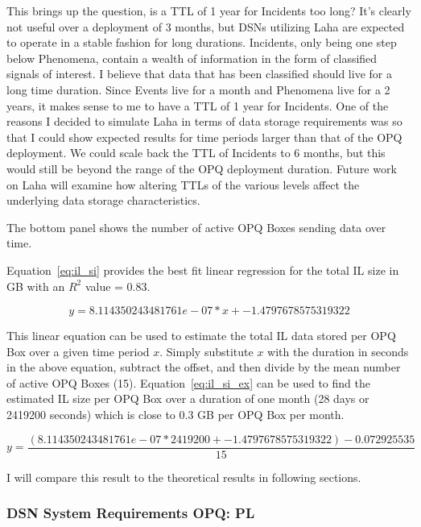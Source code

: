 This brings up the question, is a TTL of 1 year for Incidents too long? It's clearly not useful over a deployment of 3 months, but DSNs utilizing Laha are expected to operate in a stable fashion for long durations. Incidents, only being one step below Phenomena, contain a wealth of information in the form of classified signals of interest. I believe that data that has been classified should live for a long time duration. Since Events live for a month and Phenomena live for a 2 years, it makes sense to me to have a TTL of 1 year for Incidents. One of the reasons I decided to simulate Laha in terms of data storage requirements was so that I could show expected results for time periods larger than that of the OPQ deployment. We could scale back the TTL of Incidents to 6 months, but this would still be beyond the range of the OPQ deployment duration. Future work on Laha will examine how altering TTLs of the various levels affect the underlying data storage characteristics.

The bottom panel shows the number of active OPQ Boxes sending data over time.

Equation~\ref{eq:il_si} provides the best fit linear regression for the total IL size in GB with an $R^2$ value = 0.83.

\begin{equation}
    y = 8.114350243481761e-07 * x + -1.4797678575319322
    \label{eq:il_si}
\end{equation}

This linear equation can be used to estimate the total IL data stored per OPQ Box over a given time period $x$. Simply substitute $x$ with the duration in seconds in the above equation, subtract the offset, and then divide by the mean number of active OPQ Boxes (15). Equation~\ref{eq:il_si_ex} can be used to find the estimated IL size per OPQ Box over a duration of one month (28 days or 2419200 seconds) which is close to 0.3 GB per OPQ Box per month.

\begin{equation}
    y = \frac{(8.114350243481761e-07 * 2419200 + -1.4797678575319322) - 0.072925535}{15}
    \label{eq:il_si_ex}
\end{equation}

I will compare this result to the theoretical results in following sections.

\subsubsection{DSN System Requirements OPQ: PL}

